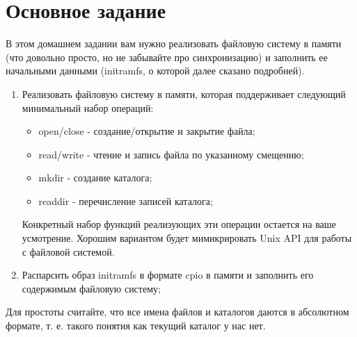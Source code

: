 \section{Основное задание}

В этом домашнем задании вам нужно реализовать файловую систему в памяти (что
довольно просто, но не забывайте про синхронизацию) и заполнить ее начальными
данными (initramfs, о которой далее сказано подробней).

\begin{enumerate}
  \item Реализовать файловую систему в памяти, которая поддерживает следующий
        минимальный набор операций:
        \begin{itemize}
          \item open/close - создание/открытие и закрытие файла;
          \item read/write - чтение и запись файла по указанному смещению;
          \item mkdir - создание каталога;
          \item readdir - перечисление записей каталога;
        \end{itemize}
        Конкретный набор функций реализующих эти операции остается на ваше
        усмотрение. Хорошим вариантом будет мимикрировать Unix API для работы
        с файловой системой.
  \item Распарсить образ initramfs в формате cpio в памяти и заполнить его
        содержимым файловую систему;
\end{enumerate}

Для простоты считайте, что все имена файлов и каталогов даются в абсолютном
формате, т. е. такого понятия как текущий каталог у нас нет.
